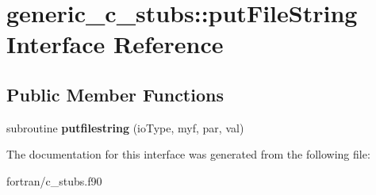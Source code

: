 \hypertarget{interfacegeneric__c__stubs_1_1put_file_string}{}\section{generic\+\_\+c\+\_\+stubs\+:\+:put\+File\+String Interface Reference}
\label{interfacegeneric__c__stubs_1_1put_file_string}
\subsection*{Public Member Functions}
\begin{DoxyCompactItemize}
\item 
\mbox{\label{interfacegeneric__c__stubs_1_1put_file_string_a1bc6a2b2731d359975648d29cf625599}} 
subroutine {\bfseries putfilestring} (io\+Type, myf, par, val)
\end{DoxyCompactItemize}


The documentation for this interface was generated from the following file\+:\begin{DoxyCompactItemize}
\item 
fortran/c\+\_\+stubs.\+f90\end{DoxyCompactItemize}
